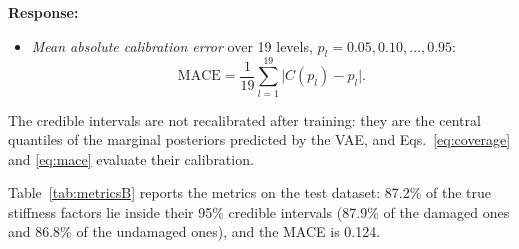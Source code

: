 \documentclass[11pt]{article}
\newenvironment{response}{\par\smallskip\noindent\color{resp}\textbf{Response:}\ }{\par}
\begin{document}
\begin{response}
\begin{itemize}[leftmargin=*]
\begin{equation}
			C(p)=\frac{1}{ND}\sum_{t=1}^{N}\sum_{d=1}^{D}\mathbb{I}\Big[\frac{1-p}{2}\le F_{t,d}\big(z^*_{t,d}\big)\le\frac{1+p}{2}\Big],
			\label{eq:coverage}
		\end{equation}
		where $\mathbb{I}[\cdot]$ equals 1 if the condition holds and 0 otherwise. The 95\% coverage is $C(0.95)$. If the
		posterior is calibrated, $C(p)\approx p$; a lower value (undercoverage) means that the true values fall outside the
		intervals more often than their level indicates.
		\item \emph{Mean absolute calibration error} over 19 levels, $p_l=0.05,0.10,\dots,0.95$:
		\begin{equation}
			\mathrm{MACE}=\frac{1}{19}\sum_{l=1}^{19}\big|C(p_l)-p_l\big|.
			\label{eq:mace}
		\end{equation}
	\end{itemize}
	The credible intervals are not recalibrated after training: they are the central quantiles of the marginal posteriors
	predicted by the VAE, and Eqs.~\eqref{eq:coverage} and \eqref{eq:mace} evaluate their calibration.


	Table~\ref{tab:metricsB} reports the metrics on the test dataset: 87.2\% of the true stiffness factors lie inside their 95\%
	credible intervals (87.9\% of the damaged ones and 86.8\% of the undamaged ones), and the MACE is 0.124.
	

\end{response}
\end{document}
